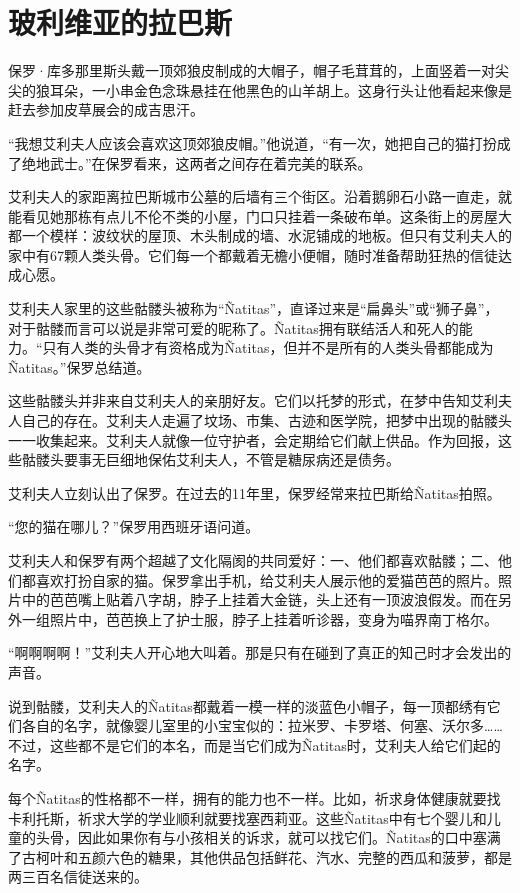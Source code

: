 \documentclass[12pt,oneside]{book}
\begin{document}
\section{玻利维亚的拉巴斯}
\begin{bookref}[frametitle={\cite{好好告别}}]
保罗·库多那里斯头戴一顶郊狼皮制成的大帽子，帽子毛茸茸的，上面竖着一对尖尖的狼耳朵，一小串金色念珠悬挂在他黑色的山羊胡上。这身行头让他看起来像是赶去参加皮草展会的成吉思汗。

“我想艾利夫人应该会喜欢这顶郊狼皮帽。”他说道，“有一次，她把自己的猫打扮成了绝地武士。”在保罗看来，这两者之间存在着完美的联系。

艾利夫人的家距离拉巴斯城市公墓的后墙有三个街区。沿着鹅卵石小路一直走，就能看见她那栋有点儿不伦不类的小屋，门口只挂着一条破布单。这条街上的房屋大都一个模样：波纹状的屋顶、木头制成的墙、水泥铺成的地板。但只有艾利夫人的家中有67颗人类头骨。它们每一个都戴着无檐小便帽，随时准备帮助狂热的信徒达成心愿。

艾利夫人家里的这些骷髅头被称为“Ñatitas”，直译过来是“扁鼻头”或“狮子鼻”，对于骷髅而言可以说是非常可爱的昵称了。Ñatitas拥有联结活人和死人的能力。“只有人类的头骨才有资格成为Ñatitas，但并不是所有的人类头骨都能成为Ñatitas。”保罗总结道。

这些骷髅头并非来自艾利夫人的亲朋好友。它们以托梦的形式，在梦中告知艾利夫人自己的存在。艾利夫人走遍了坟场、市集、古迹和医学院，把梦中出现的骷髅头一一收集起来。艾利夫人就像一位守护者，会定期给它们献上供品。作为回报，这些骷髅头要事无巨细地保佑艾利夫人，不管是糖尿病还是债务。

艾利夫人立刻认出了保罗。在过去的11年里，保罗经常来拉巴斯给Ñatitas拍照。

“您的猫在哪儿？”保罗用西班牙语问道。

艾利夫人和保罗有两个超越了文化隔阂的共同爱好：一、他们都喜欢骷髅；二、他们都喜欢打扮自家的猫。保罗拿出手机，给艾利夫人展示他的爱猫芭芭的照片。照片中的芭芭嘴上贴着八字胡，脖子上挂着大金链，头上还有一顶波浪假发。而在另外一组照片中，芭芭换上了护士服，脖子上挂着听诊器，变身为喵界南丁格尔。

“啊啊啊啊！”艾利夫人开心地大叫着。那是只有在碰到了真正的知己时才会发出的声音。

说到骷髅，艾利夫人的Ñatitas都戴着一模一样的淡蓝色小帽子，每一顶都绣有它们各自的名字，就像婴儿室里的小宝宝似的：拉米罗、卡罗塔、何塞、沃尔多……不过，这些都不是它们的本名，而是当它们成为Ñatitas时，艾利夫人给它们起的名字。

每个Ñatitas的性格都不一样，拥有的能力也不一样。比如，祈求身体健康就要找卡利托斯，祈求大学的学业顺利就要找塞西莉亚。这些Ñatitas中有七个婴儿和儿童的头骨，因此如果你有与小孩相关的诉求，就可以找它们。Ñatitas的口中塞满了古柯叶和五颜六色的糖果，其他供品包括鲜花、汽水、完整的西瓜和菠萝，都是两三百名信徒送来的。


\end{bookref}
\end{document}
